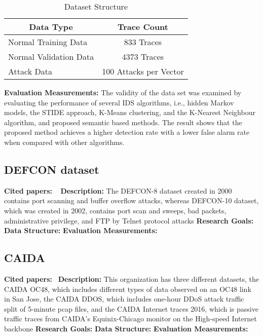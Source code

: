 \begin{table}[h]
\begin{tabular}{|l|c|}
\hline
\multicolumn{1}{|c|}{\textbf{Data Type}} & \textbf{Trace Count} \\ \hline
Normal Training Data & 833 Traces \\ \hline
Normal Validation Data & 4373 Traces \\ \hline
Attack Data & 100 Attacks per Vector \\ \hline
\end{tabular}
\caption{Dataset Structure}
\end{table}

\textbf{Evaluation Measurements:} The validity of the data set was examined by evaluating the performance of several IDS algorithms, i.e., hidden Markov models, the STIDE approach, K-Means clustering, and the K-Nearest Neighbour algorithm, and proposed semantic based methods. The result shows that the proposed method achieves a higher detection rate with a lower false alarm rate when compared with other algorithms.\newline

\subsection{DEFCON dataset}
\textbf{Cited papers:} ~\cite{nehinbe2009simple} \newline
\textbf{Description:} The
DEFCON-8 dataset created in 2000 contains port scanning and buffer overflow attacks, whereas DEFCON-10 dataset, which was created in 2002,
contains port scan and sweeps, bad packets, administrative privilege, and FTP by Telnet protocol attacks\newline
\textbf{Research Goals:}  \newline
\textbf{Data Structure:} \newline
\textbf{Evaluation Measurements:} \newline





\subsection{CAIDA}
\textbf{Cited papers:}~\cite{shiravi2012toward} \newline
\textbf{Description:} This organization has three different datasets, the CAIDA OC48, which includes different types of data observed on an OC48 link in San Jose, the CAIDA DDOS, which includes one-hour DDoS attack traffic split of 5-minute pcap files, and the CAIDA Internet traces 2016, which is passive traffic traces from CAIDA’s Equinix-Chicago monitor on
the High-speed Internet backbone\newline
\textbf{Research Goals:}  \newline
\textbf{Data Structure:} \newline
\textbf{Evaluation Measurements:} \newline





